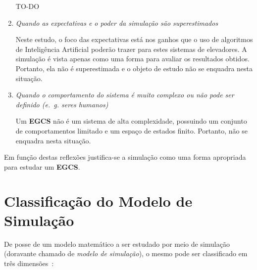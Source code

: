 \begin{enumerate}
TO-DO %

\item \textit{Quando as expectativas e o poder da simulação são superestimados}

Neste estudo, o foco das expectativas está nos ganhos que o uso de algoritmos de
Inteligência Artificial poderão trazer para estes sistemas de elevadores. A
simulação é vista apenas como uma forma para avaliar os resultados obtidos.
Portanto, ela não é superestimada e o objeto de estudo não se enquadra nesta
situação.

\item \textit{Quando o comportamento do sistema é muito complexo ou não pode ser
definido (e.~g. seres humanos)}

Um \textbf{EGCS} não é um sistema de alta complexidade, possuindo um conjunto de
comportamentos limitado e um espaço de estados finito. Portanto, não se enquadra
nesta situação.

\end{enumerate}

Em função destas reflexões justifica-se a simulação como uma forma apropriada
para estudar um \textbf{EGCS}.

\section{Classificação do Modelo de Simulação}

De posse de um modelo matemático a ser estudado por meio de simulação (doravante
chamado de \textit{modelo de simulação}), o mesmo pode ser classificado em três
dimensões~\cite{Banks,Law}:

